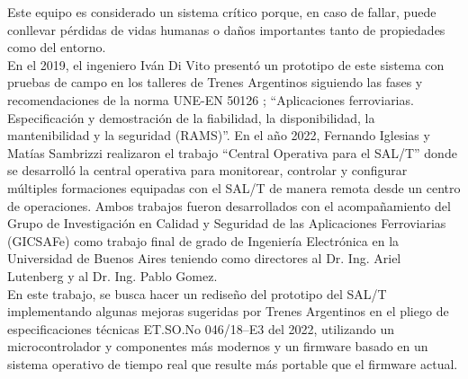 Este equipo es considerado un sistema crítico porque, en caso de fallar, puede conllevar pérdidas de vidas humanas o daños importantes tanto de propiedades como del entorno. \\


En el 2019, el ingeniero Iván Di Vito presentó un prototipo de este sistema \cite{salt_ivan} con pruebas de campo en los talleres de Trenes Argentinos \cite{trenes_arg} siguiendo las fases y recomendaciones de la norma UNE-EN 50126 \cite{norma_50126};  ``Aplicaciones ferroviarias. Especificación y demostración de la fiabilidad, la disponibilidad, la mantenibilidad y la seguridad (RAMS)''. En el año 2022, Fernando Iglesias y Matías Sambrizzi realizaron el trabajo “Central Operativa para el SAL/T” \cite{central_op} donde se desarrolló la central operativa para monitorear, controlar y configurar múltiples formaciones equipadas con el SAL/T de manera remota desde un centro de operaciones. Ambos trabajos fueron desarrollados con el acompañamiento del Grupo de Investigación en Calidad y Seguridad de las Aplicaciones Ferroviarias (GICSAFe) \cite{gicasfe} como trabajo final de grado de Ingeniería Electrónica en la Universidad de Buenos Aires teniendo como directores al Dr. Ing. Ariel Lutenberg y al Dr. Ing. Pablo Gomez. \\

En este trabajo, se busca hacer un rediseño del prototipo del SAL/T implementando algunas mejoras sugeridas por Trenes Argentinos en el pliego de especificaciones técnicas ET.SO.No 046/18–E3 \cite{spec} del 2022, utilizando un microcontrolador y componentes más modernos y un firmware basado en un sistema operativo de tiempo real que resulte más portable que el firmware actual. 